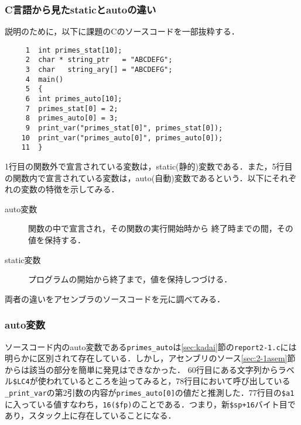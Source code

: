 \documentclass[a4j,11pt]{jarticle}
\begin{document}
  \subsubsection{C言語から見たstaticとautoの違い}
説明のために，以下に課題のCのソースコードを一部抜粋する．
\begin{verbatim}
     1	int primes_stat[10]; 
     2	char * string_ptr   = "ABCDEFG";
     3	char   string_ary[] = "ABCDEFG";
     4	main()
     5	{
     6	int primes_auto[10];
     7	primes_stat[0] = 2;
     8	primes_auto[0] = 3;
     9	print_var("primes_stat[0]", primes_stat[0]);
    10	print_var("primes_auto[0]", primes_auto[0]);
    11	}
\end{verbatim}
1行目の関数外で宣言されている変数は，static(静的)変数である．また，5行目の関数内で宣言されている変数は，auto(自動)変数であるという．以下にそれぞれの変数の特徴を示してみる．
\begin{description}
\item[auto変数]関数の中で宣言され，その関数の実行開始時から 終了時までの間，その値を保持する．
\item[static変数]プログラムの開始から終了まで，値を保持しつづける．
\end{description}
両者の違いをアセンブラのソースコードを元に調べてみる．
\subsubsection{auto変数}
ソースコード内のauto変数である\verb|primes_auto|は\ref{sec:kadai}節の\verb|report2-1.c|には明らかに区別されて存在している．しかし，アセンブリのソース\ref{sec:2-1asem}節からは該当の部分を簡単に発見はできなかった．
60行目にある文字列からラベル\verb|$LC4|が使われているところを辿ってみると，78行目において呼び出している\verb|_print_var|の第2引数の内容が\verb|primes_auto[0]|の値だと推測した．77行目の\verb|$a1|に入っている値すなわち，\verb|16($fp)|のことである．つまり，新\verb|$sp+16|バイト目であり，スタック上に存在していることになる．
\end{document}
